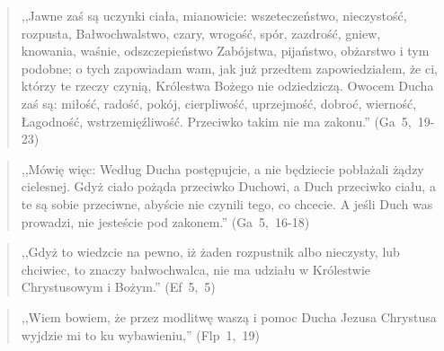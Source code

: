 \documentclass[10pt,a4paper,oneside]{article}
\begin{document}
\begin{quote}
,,Jawne zaś są uczynki ciała, mianowicie: wszeteczeństwo, nieczystość, rozpusta, Bałwochwalstwo, czary, wrogość, spór, zazdrość, gniew, knowania, waśnie, odszczepieństwo Zabójstwa, pijaństwo, obżarstwo i tym podobne; o tych zapowiadam wam, jak już przedtem zapowiedziałem, że ci, którzy te rzeczy czynią, Królestwa Bożego nie odziedziczą. Owocem Ducha zaś są: miłość, radość, pokój, cierpliwość, uprzejmość, dobroć, wierność, Łagodność, wstrzemięźliwość. Przeciwko takim nie ma zakonu.'' (Ga~5,~19-23)
\end{quote}
\begin{quote}
,,Mówię więc: Według Ducha postępujcie, a nie będziecie pobłażali żądzy cielesnej. Gdyż ciało pożąda przeciwko Duchowi, a Duch przeciwko ciału, a te są sobie przeciwne, abyście nie czynili tego, co chcecie. A jeśli Duch was prowadzi, nie jesteście pod zakonem.'' (Ga~5,~16-18)
\end{quote}
\begin{quote}
,,Gdyż to wiedzcie na pewno, iż żaden rozpustnik albo nieczysty, lub chciwiec, to znaczy bałwochwalca, nie ma udziału w Królestwie Chrystusowym i Bożym.'' (Ef~5,~5)
\end{quote}
\begin{quote}
,,Wiem bowiem, że przez modlitwę waszą i pomoc Ducha Jezusa Chrystusa wyjdzie mi to ku wybawieniu,'' (Flp~1,~19)
\end{quote}
\end{document}
